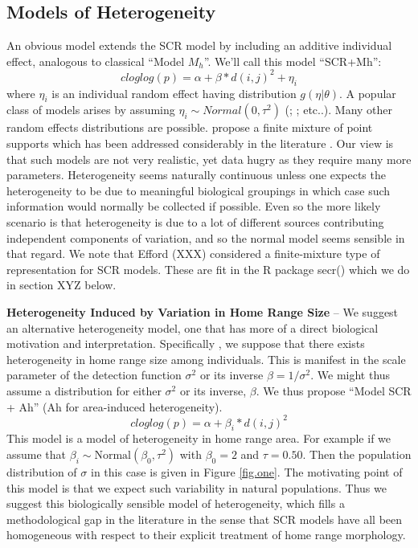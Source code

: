 \subsection{Models of Heterogeneity}

An obvious model extends the SCR model by including an additive individual effect, analogous to classical ``Model $M_{h}$''. We'll call this model ``SCR+Mh'': 
\[  
 cloglog(p) = \alpha + \beta*d(i,j)^2  + \eta_{i}
\]
where $\eta_{i}$ is an individual random effect having distribution
$g(\eta|\theta)$.  A popular class of models arises by assuming
$\eta_{i} \sim Normal(0,\tau^{2})$ (\citet{coull_agresti:1999};
\citet{dorazio_royle:2003}; etc..).  Many other random effects
distributions are possible. \citet{norris_pollock:1996} propose a
finite mixture of point supports which has been addressed considerably
in the literature \citep{pledger:2003; dorazio_royle:2003; link:2003}.  Our view is that such models are not very realistic, yet data hugry as they require many more parameters. Heterogeneity seems naturally continuous unless one expects the heterogeneity to be due to meaningful biological groupings in which case such information would normally be collected if possible.  Even so the more likely scenario is that heterogeneity is due to a lot of different sources contributing independent components of variation, and so the normal model seems sensible in that regard. We note that Efford (XXX) considered a finite-mixture type of representation for SCR models. These are fit in the R package secr() which we do in section XYZ below. 

{\bf Heterogeneity Induced by Variation in Home Range Size} -- We suggest an alternative heterogeneity model, one that has more of a direct biological motivation and interpretation. Specifically , we suppose that there exists heterogeneity in home range size among individuals. This is manifest in the scale parameter of the detection function $\sigma^{2}$ or its inverse $\beta = 1/\sigma^{2}$. We might
thus assume a distribution for either $\sigma^{2}$ or its inverse,
$\beta$.  We thus propose ``Model SCR + Ah'' (Ah for area-induced
heterogeneity).
\[
 cloglog(p) = \alpha + \beta_{i}*d(i,j)^2 
\]  
This model is a model of heterogeneity in home range area. For example
if we assume that $\beta_{i} \sim \mbox{Normal}(\beta_0,\tau^{2})$
with $\beta_{0} = 2$ and $\tau = 0.50$. Then the population
distribution of $\sigma$ in this case is given in Figure
\ref{fig.one}. The motivating point of this model is that we expect
such variability in natural populations. Thus we suggest this
biologically sensible model of heterogeneity, which fills a
methodological gap in the literature in the sense that SCR models have
all been homogeneous with respect to their explicit treatment of home
range morphology.

